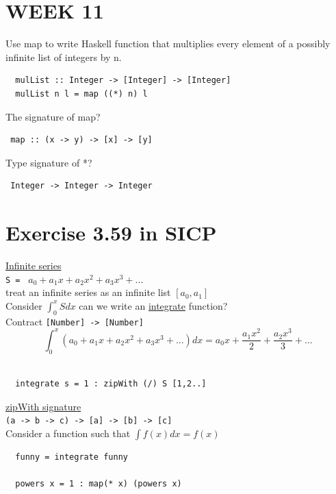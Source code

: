 \documentclass{article}
\begin{document}
\begin{flushleft}
 \section*{WEEK 11}
 \begin{flushleft}
 Use map to write Haskell function that multiplies every element of a possibly infinite list of integers by n.\\
 \begin{verbatim}
  mulList :: Integer -> [Integer] -> [Integer]
  mulList n l = map ((*) n) l
 \end{verbatim}
The signature of map?\\
\begin{verbatim}
 map :: (x -> y) -> [x] -> [y]
\end{verbatim}
Type signature of *?
\begin{verbatim}
 Integer -> Integer -> Integer
\end{verbatim}
\end{flushleft}
\section*{Exercise 3.59 in SICP}
\begin{flushleft}
 \underline{Infinite series}\\
 \verb|S = |  $a_0 + a_1x + a_2x^2 + a_3x^3 + ... $\\
 treat an infinite series as an infinite list $[a_0, a_1]$\\
 \bigskip
 Consider $\int_{0}^{x} Sdx$ can we write an \underline{integrate} function?\\
 \bigskip
 Contract \verb|[Number] -> [Number]|\\
 $$\int_{0}^{x} (a_0 + a_1x + a_2x^2 + a_3x^3 + ...) dx = a_0x + \frac{a_1x^2}{2} + \frac{a_2x^3}{3} + ...$$\\
 \begin{verbatim}
  integrate s = 1 : zipWith (/) S [1,2..]
 \end{verbatim}
 \underline{zipWith signature}\\
 \verb|(a -> b -> c) -> [a] -> [b] -> [c]|\\
 \bigskip
 Consider a function such that $\int f(x)dx = f(x)$\\
 \begin{verbatim}
  funny = integrate funny
  
  powers x = 1 : map(* x) (powers x)
 \end{verbatim}
\end{flushleft}

\end{flushleft}
\end{document}
